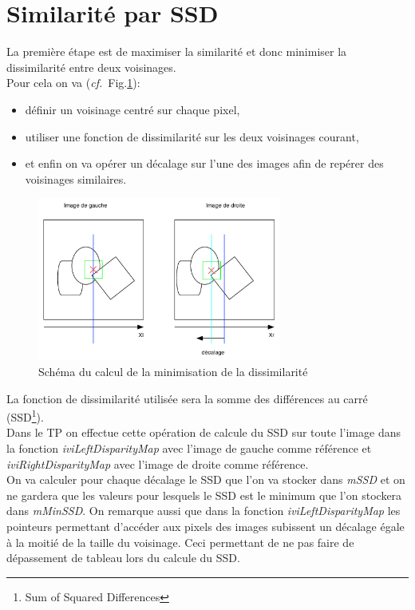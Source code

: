 \documentclass[a4paper,10pt]{article}
\begin{document}
\section{Similarit\'e par SSD}

La premi\`ere \'etape est de maximiser la similarit\'e et donc minimiser la dissimilarit\'e entre deux voisinages. \\

Pour cela on va (\emph{cf.}~Fig.\ref{calcule_SSD}):
\begin{itemize} 
	\item d\'efinir un voisinage centr\'e sur chaque pixel,
	\item utiliser une fonction de dissimilarit\'e sur les deux voisinages courant,
	\item et enfin on va op\'erer un d\'ecalage sur l'une des images afin de rep\'erer des voisinages similaires.
\end{itemize}

\begin{figure}[ht]
\begin{center}
	\includegraphics[width=8cm]{images/calcule_SSD}
\end{center}
	\caption{Sch\'ema du calcul de la minimisation de la dissimilarit\'e}
	\label{calcule_SSD}
\end{figure}

La fonction de dissimilarit\'e utilis\'ee sera la somme des diff\'erences au carr\'e (SSD\footnote{Sum of Squared Differences}). \\

Dans le TP on effectue cette op\'eration de calcule du SSD sur toute l'image dans la fonction \emph{iviLeftDisparityMap} avec l'image de gauche comme r\'ef\'erence et \emph{iviRightDisparityMap} avec l'image de droite comme r\'ef\'erence. \\

On va calculer pour chaque d\'ecalage le SSD que l'on va stocker dans \emph{mSSD} et on ne gardera que les valeurs pour lesquels le SSD est le minimum que l'on stockera dans \emph{mMinSSD}. On remarque aussi que dans la fonction \emph{iviLeftDisparityMap}  les pointeurs permettant d'acc\'eder aux pixels des images subissent un d\'ecalage \'egale \`a la moiti\'e de la taille du voisinage. Ceci permettant de ne pas faire de d\'epassement de tableau lors du calcule du SSD. \\
\end{document}
